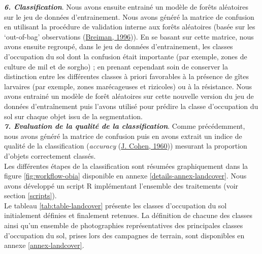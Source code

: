 \documentclass[12pt,twoside]{reedthesis}
\begin{document}
\textbf{\emph{6. Classification}}. Nous avons ensuite entrainé un modèle de forêts aléatoires sur le jeu de données d'entrainement. Nous avons généré la matrice de confusion en utilisant la procédure de validation interne aux forêts aléatoires (basée sur les `out-of-bag' observations (\protect\hyperlink{ref-Breiman1996OUTOFBAGE}{Breiman, 1996})). En se basant sur cette matrice, nous avons ensuite regroupé, dans le jeu de données d'entrainement, les classes d'occupation du sol dont la confusion était importante (par exemple, zones de culture de mil et de sorgho) ; en prenant cependant soin de conserver la distinction entre les différentes classes à priori favorables à la présence de gîtes larvaires (par exemple, zones marécageuses et rizicoles) ou à la résistance. Nous avons entrainé un modèle de forêt aléatoires sur cette nouvelle version du jeu de données d'entraînement puis l'avons utilisé pour prédire la classe d'occupation du sol sur chaque objet issu de la segmentation.\\

\textbf{\emph{7. Evaluation de la qualité de la classification}}. Comme précédemment, nous avons généré la matrice de confusion puis en avons extrait un indice de qualité de la classification (\emph{accuracy} (\protect\hyperlink{ref-cohen_coefficient_1960}{J. Cohen, 1960})) mesurant la proportion d'objets correctement classés.\\

Les différentes étapes de la classification sont résumées graphiquement dans la figure \ref{fig:workflow-obia} disponible en annexe \ref{details-annex-landcover}. Nous avons développé un script R implémentant l'ensemble des traitements (voir section \ref{scripts}).\\

Le tableau \ref{tab:table-landcover} présente les classes d'occupation du sol initialement définies et finalement retenues. La définition de chacune des classes ainsi qu'un ensemble de photographies représentatives des principales classes d'occupation du sol, prises lors des campagnes de terrain, sont disponibles en annexe \ref{annex-landcover}.
\end{document}
